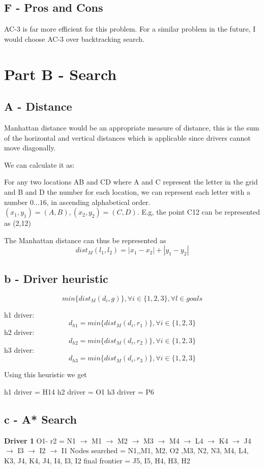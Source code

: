 \documentclass{article}
\begin{document}
\subsection{F - Pros and Cons}

AC-3 is far more efficient for this problem. For a similar problem in the future, I would choose AC-3 over backtracking search. 

\section{Part B - Search}

\subsection{A - Distance}

Manhattan distance would be an appropriate measure of distance, this is the sum of the horizontal and vertical distances which is applicable since drivers cannot move diagonally.

We can calculate it as:

For any two locations AB and CD where A and C represent the letter in the grid and B and D the number for each location, we can represent each letter with a number $0...16$, in ascending alphabetical order. $(x_1,y_1) = (A,B), (x_2,y_2) = (C,D)$.
E.g, the point C12 can be represented as (2,12)

The Manhattan distance can thus be represented as $$dist_M(l_1,l_2) = |x_1-x_2|+ |y_1-y_2|$$

\subsection{b - Driver heuristic}
$$ min\{dist_M(d_i, g)\}, \forall i \in \{1,2,3\}, \forall l \in goals$$

h1 driver: $$d_{h1} = min\{dist_M(d_i, r_1)\}, \forall i \in \{1,2,3\}$$
h2 driver: $$d_{h2} = min\{dist_M(d_i, r_2)\}, \forall i \in \{1,2,3\}$$
h3 driver: $$d_{h3} = min\{dist_M(d_i, r_3)\}, \forall i \in \{1,2,3\}$$

Using this heuristic we get 

h1 driver = H14
h2 driver = O1
h3 driver = P6

\subsection{c - A* Search}

\textbf{Driver 1} \newline
O1- r2 = N1 $\to$ M1 $\to $ M2 $\to$ M3 $\to$ M4 $\to$ L4 $\to$ K4 $\to$ J4 $\to$ I3 $\to$ I2 $\to$ I1 \newline
Nodes searched = N1,,M1, M2, O2 ,M3, N2, N3, M4, L4, K3, J4, K4, J4, I4, I3, I2 \newline
final frontier =  J5, I5, H4, H3, H2 \newline
\end{document}
